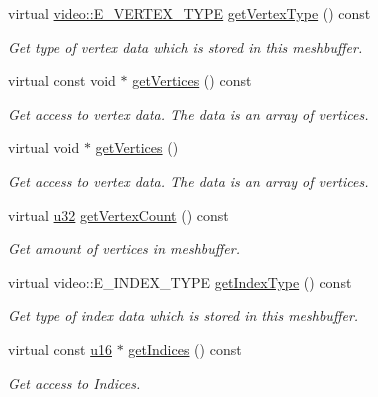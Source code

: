 \begin{DoxyCompactItemize}
virtual \hyperlink{namespaceirr_1_1video_a0e3b59e025e0d0db0ed2ee0ce904deac}{video\+::\+E\+\_\+\+V\+E\+R\+T\+E\+X\+\_\+\+T\+Y\+PE} \hyperlink{classirr_1_1scene_1_1IDynamicMeshBuffer_a3e7523774efaf9a177de6396dfdc14e2}{get\+Vertex\+Type} () const
\begin{DoxyCompactList}\small\item\em Get type of vertex data which is stored in this meshbuffer. \end{DoxyCompactList}\item 
virtual const void $\ast$ \hyperlink{classirr_1_1scene_1_1IDynamicMeshBuffer_a433e0e8ec301ce898dc373ca65e30e85}{get\+Vertices} () const
\begin{DoxyCompactList}\small\item\em Get access to vertex data. The data is an array of vertices. \end{DoxyCompactList}\item 
virtual void $\ast$ \hyperlink{classirr_1_1scene_1_1IDynamicMeshBuffer_a449643505823c7cfe793c5a82cde5fa4}{get\+Vertices} ()
\begin{DoxyCompactList}\small\item\em Get access to vertex data. The data is an array of vertices. \end{DoxyCompactList}\item 
virtual \hyperlink{namespaceirr_a0416a53257075833e7002efd0a18e804}{u32} \hyperlink{classirr_1_1scene_1_1IDynamicMeshBuffer_afc317a8ccda7e7eceb1f4955c90848d2}{get\+Vertex\+Count} () const
\begin{DoxyCompactList}\small\item\em Get amount of vertices in meshbuffer. \end{DoxyCompactList}\item 
virtual video\+::\+E\+\_\+\+I\+N\+D\+E\+X\+\_\+\+T\+Y\+PE \hyperlink{classirr_1_1scene_1_1IDynamicMeshBuffer_a3ac73aed8c40103682c5c6388339e70d}{get\+Index\+Type} () const
\begin{DoxyCompactList}\small\item\em Get type of index data which is stored in this meshbuffer. \end{DoxyCompactList}\item 
virtual const \hyperlink{namespaceirr_ae9f8ec82692ad3b83c21f555bfa70bcc}{u16} $\ast$ \hyperlink{classirr_1_1scene_1_1IDynamicMeshBuffer_ab762d23eb5666125dad83ce20f15b4dd}{get\+Indices} () const
\begin{DoxyCompactList}\small\item\em Get access to Indices. \end{DoxyCompactList}\item 

\end{DoxyCompactItemize}
